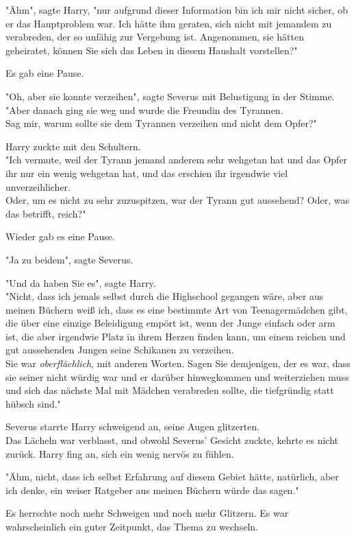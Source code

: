 {"Ähm", sagte Harry, "nur aufgrund dieser Information bin ich mir nicht sicher, ob er das Hauptproblem war. Ich hätte ihm geraten, sich nicht mit jemandem zu verabreden, der so unfähig zur Vergebung ist. Angenommen, sie hätten geheiratet, können Sie sich das Leben in diesem Haushalt vorstellen?"

Es gab eine Pause.

"Oh, aber sie konnte verzeihen", sagte Severus mit Belustigung in der Stimme.\\ "Aber danach ging sie weg und wurde die Freundin des Tyrannen.\\ Sag mir, warum sollte sie dem Tyrannen verzeihen und nicht dem Opfer?"

Harry zuckte mit den Schultern.\\ "Ich vermute, weil der Tyrann jemand anderem sehr wehgetan hat und das Opfer ihr nur ein wenig wehgetan hat, und das erschien ihr irgendwie viel unverzeihlicher.\\ Oder, um es nicht zu sehr zuzuspitzen, war der Tyrann gut aussehend? Oder, was das betrifft, reich?"

Wieder gab es eine Pause.

"Ja zu beidem", sagte Severus.

"Und da haben Sie es", sagte Harry.\\ "Nicht, dass ich jemals selbst durch die Highschool gegangen wäre, aber aus meinen Büchern weiß ich, dass es eine bestimmte Art von Teenagermädchen gibt, die über eine einzige Beleidigung empört ist, wenn der Junge einfach oder arm ist, die aber irgendwie Platz in ihrem Herzen finden kann, um einem reichen und gut aussehenden Jungen seine Schikanen zu verzeihen.\\ Sie war \emph{oberflächlich}, mit anderen Worten. Sagen Sie demjenigen, der es war, dass sie seiner nicht würdig war und er darüber hinwegkommen und weiterziehen muss und sich das nächste Mal mit Mädchen verabreden sollte, die tiefgründig statt hübsch sind."

Severus starrte Harry schweigend an, seine Augen glitzerten.\\ Das Lächeln war verblasst, und obwohl Severus' Gesicht zuckte, kehrte es nicht zurück. Harry fing an, sich ein wenig nervös zu fühlen.

"Ähm, nicht, dass ich selbst Erfahrung auf diesem Gebiet hätte, natürlich, aber ich denke, ein weiser Ratgeber aus meinen Büchern würde das sagen."

Es herrschte noch mehr Schweigen und noch mehr Glitzern. Es war wahrscheinlich ein guter Zeitpunkt, das Thema zu wechseln.

}
